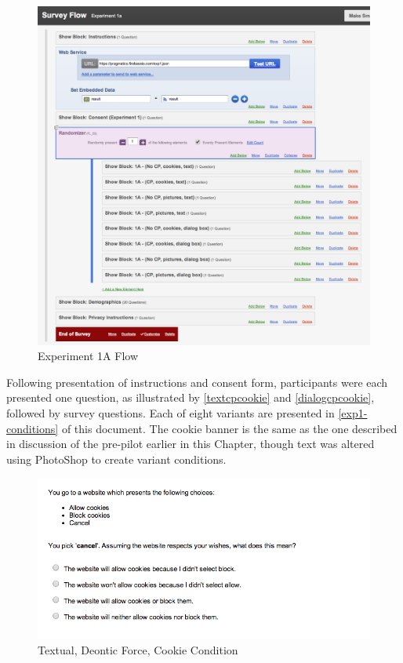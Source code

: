 \begin{figure}
\centerline{
  \includegraphics[scale=.3]{chapter5.tex/1a-flow}
  }
\caption[scale=.5]{Experiment 1A Flow}
\label{1A-flow}
\end{figure}

Following presentation of instructions and consent form, participants were each presented one question, as illustrated by  \autoref{textcpcookie} and \autoref{dialogcpcookie},  followed by survey questions. Each of eight variants are presented in  \autoref{exp1-conditions}  of this document. The cookie banner is the same as the one described in discussion of the pre-pilot earlier in this Chapter, though text was altered using PhotoShop to create variant conditions.


\begin{figure}
\centerline{
  \includegraphics[scale=.5]{chapter5.tex/textcpcookie}
  }
\caption{Textual, Deontic Force, Cookie Condition}
\label{textcpcookie}
\end{figure}

